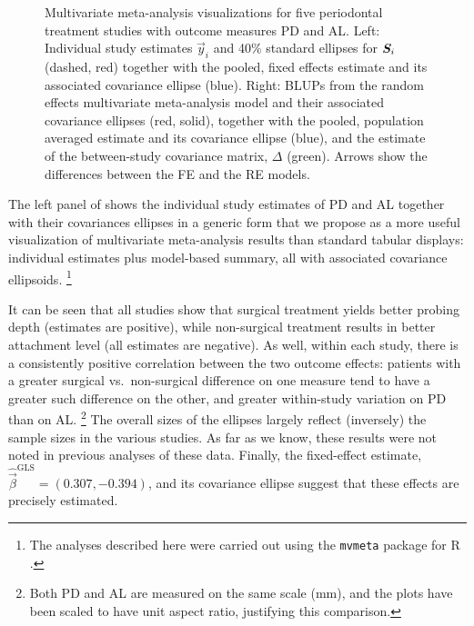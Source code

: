 \begin{figure}[htb]
\begin{minipage}[b]{.49\linewidth}
 \end{minipage}
  \caption{Multivariate meta-analysis visualizations for five periodontal treatment studies with outcome measures PD and AL.
  Left: Individual study estimates $\vec{y}_i$ and 40\% standard ellipses for $\bm{S}_i$ (dashed, red) together with the pooled,
  fixed effects estimate and its associated covariance ellipse (blue).
  Right:  BLUPs from the random effects multivariate meta-analysis model and their associated covariance ellipses
  (red, solid), together with the pooled, population averaged estimate and its covariance ellipse (blue), and the estimate
  of the between-study covariance matrix, $\Delta$ (green). Arrows show the differences between the FE and the RE models.}
  \label{fig:mvmeta2}
\end{figure}

The left panel of  shows the individual study estimates of PD and AL together with their covariances ellipses
in a generic form that we propose as a more useful visualization of multivariate meta-analysis results than standard
tabular displays: individual estimates plus model-based summary, all with associated covariance ellipsoids.%
\footnote{The analyses described here were carried out using the \texttt{mvmeta} package for R \citep{mvmeta}.}

It can be seen that all studies show that surgical treatment yields better probing depth (estimates are positive), while
non-surgical treatment results in better attachment level (all estimates are negative).  As well, within each study, there is a consistently
positive correlation between the two outcome effects: patients with a greater surgical vs.\ non-surgical difference on one
measure tend to have a greater such difference on the other, and greater within-study variation on PD than on AL.%
\footnote{Both PD and AL are measured on the same scale (mm), and the plots have been scaled to have unit aspect ratio,
justifying this comparison.}
The overall sizes of the ellipses largely reflect (inversely) the sample sizes in the various studies.
As far as we know, these results were not noted in previous analyses of these data.
Finally, the fixed-effect estimate, $\widehat{\vec{\beta}}^{\textrm{GLS}} = (0.307, -0.394)$,
and its covariance ellipse suggest that these effects are precisely estimated.

